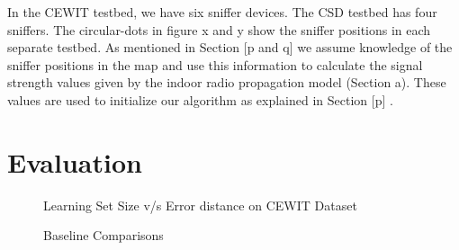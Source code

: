 \documentclass{Localization-PaperWriteupDraft}
\begin{document}
In the CEWIT testbed, we have six sniffer devices. The CSD testbed has four sniffers. The circular-dots in figure x and y show the sniffer positions in each separate testbed. As mentioned in Section [p and q] we assume knowledge of the sniffer positions in the map and use this information to calculate the signal strength values given by the indoor radio propagation model (Section a). These values are used to initialize our algorithm as explained in Section [p] .

\section{Evaluation}
\label{sec:evaluation}

\begin{figure}
\centering
  \caption{Learning Set Size v/s Error distance on CEWIT Dataset}
  \label{fig:learningsetsizevserrordistance}
\end{figure}

\begin{figure}
	\centering
	\caption{Baseline Comparisons}
	\label{fig:baselinecomparisons}
\end{figure}
\end{document}
